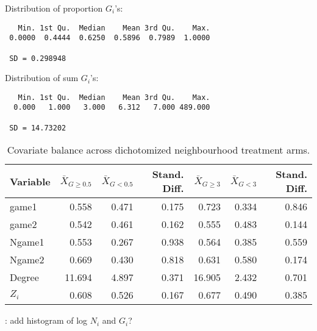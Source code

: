 \documentclass[10pt]{article}
\begin{document}
Distribution of proportion $G_i$'s:
\begin{verbatim}
   Min. 1st Qu.  Median    Mean 3rd Qu.    Max. 
 0.0000  0.4444  0.6250  0.5896  0.7989  1.0000
 
 SD = 0.298948
\end{verbatim}

Distribution of sum $G_i$'s:
\begin{verbatim}
   Min. 1st Qu.  Median    Mean 3rd Qu.    Max. 
  0.000   1.000   3.000   6.312   7.000 489.000 
  
 SD = 14.73202
\end{verbatim}

\begin{table}[H]
\centering
\begin{tabular}{@{}lrrrrrr@{}}
\toprule
Variable & $\bar{X}_{G\geq0.5}$ & $\bar{X}_{G<0.5}$ & Stand. Diff. & $\bar{X}_{G\geq3}$ & $\bar{X}_{G<3}$ & Stand. Diff. \\
\midrule
game1 & 0.558 & 0.471 & 0.175 & 0.723 & 0.334 & 0.846 \\
game2 & 0.542 & 0.461 & 0.162 & 0.555 & 0.483 & 0.144 \\
Ngame1 & 0.553 & 0.267 & 0.938 & 0.564 & 0.385 & 0.559 \\
Ngame2 & 0.669 & 0.430 & 0.818 & 0.631 & 0.580 & 0.174 \\
Degree & 11.694 & 4.897 & 0.371 & 16.905 & 2.432 & 0.701 \\
$Z_i$ & 0.608 & 0.526 & 0.167 & 0.677 & 0.490 & 0.385 \\
\bottomrule
\end{tabular}
\caption{Covariate balance across dichotomized neighbourhood treatment arms.}
\end{table}

\todo: add histogram of log $N_i$ and $G_i$?
\end{document}

